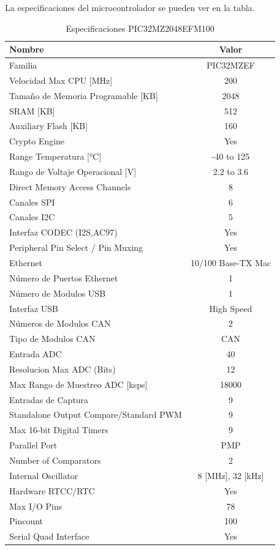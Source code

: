 \documentclass[letterpaper,12pt,oneside]{book}
\begin{document}
		La especificaciones del microcontrolador se pueden ver en la tabla.

		\begin{table}[ht]
				\centering
				\begin{tabular}{ l | c }
					\textbf{Nombre} & \textbf{Valor} \\
					\hline
					Familia & PIC32MZEF \\
					\hline
					Velocidad Max CPU [MHz] & 200 \\
					\hline
					Tamaño de Memoria Programable [KB] & 2048 \\
					\hline
					SRAM [KB] & 512\\
					\hline
					Auxiliary Flash [KB] & 160 \\
					\hline
					Crypto Engine & Yes \\
					\hline
					Range Temperatura [°C] & -40 to 125 \\
					\hline
					Rango de Voltaje Operacional [V] & 2.2 to 3.6 \\
					\hline
					Direct Memory Access Channels & 8 \\
					\hline
					Canales SPI & 6 \\
					\hline
					Canales I2C & 5 \\
					\hline
					Interfaz CODEC (I2S,AC97) & Yes \\
					\hline
					Peripheral Pin Select / Pin Muxing & Yes \\
					\hline
					Ethernet & 10/100 Base-TX Mac \\
					\hline
					Número de Puertos Ethernet  & 1 \\
					\hline
					Número de Modulos USB & 1 \\
					\hline
					Interfaz USB & High Speed \\
					\hline
					Números de Modulos CAN & 2 \\
					\hline
					Tipo de Modulos CAN & CAN \\
					\hline
					Entrada ADC & 40 \\
					\hline
					Resolucion Max ADC (Bits) & 12 \\
					\hline
					Max Rango de Muestreo ADC [ksps] & 18000 \\
					\hline
					Entradas de Captura & 9 \\
					\hline
					Standalone Output Compare/Standard PWM & 9 \\
					\hline
					Max 16-bit Digital Timers & 9 \\
					\hline
					Parallel Port & PMP \\
					\hline
					Number of Comparators & 2 \\
					\hline
					Internal Oscillator & 8 [MHz], 32 [kHz] \\
					\hline
					Hardware RTCC/RTC & Yes \\
					\hline
					Max I/O Pins & 78 \\
					\hline
					Pincount & 100 \\
					\hline
					Serial Quad Interface & Yes \\
				\end{tabular}
				\caption{Especificaciones PIC32MZ2048EFM100}
		\end{table}
\end{document}
